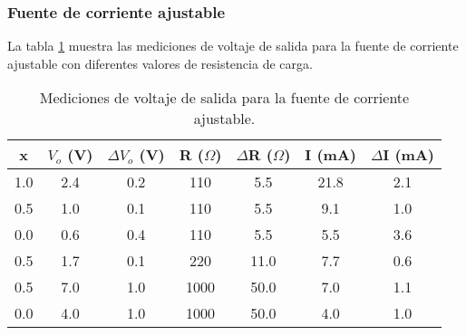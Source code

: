 \FloatBarrier
\subsubsection{Fuente de corriente ajustable}

La tabla \ref{tab:mediciones-fuente-corriente-ajustable} muestra las mediciones de voltaje de salida para la fuente de corriente ajustable con diferentes valores de resistencia de carga.

\begin{table}[ht]
    \centering
    \begin{tabular}{|c|c|c|c|c|c|c|}
        \hline
        x & $V_o$ (V) & $\Delta V_o$ (V) & R ($\Omega$) & $\Delta$R ($\Omega$) & I (mA) & $\Delta$I (mA) \\
        \hline
        1.0 & 2.4 & 0.2 & 110 & 5.5 & 21.8 & 2.1 \\
        0.5 & 1.0 & 0.1 & 110 & 5.5 & 9.1 & 1.0 \\
        0.0 & 0.6 & 0.4 & 110 & 5.5 & 5.5 & 3.6 \\
        0.5 & 1.7 & 0.1 & 220 & 11.0 & 7.7 & 0.6 \\
        0.5 & 7.0 & 1.0 & 1000 & 50.0 & 7.0 & 1.1 \\
        0.0 & 4.0 & 1.0 & 1000 & 50.0 & 4.0 & 1.0 \\
        \hline
    \end{tabular}
    \caption{Mediciones de voltaje de salida para la fuente de corriente ajustable.}
    \label{tab:mediciones-fuente-corriente-ajustable}
\end{table}
